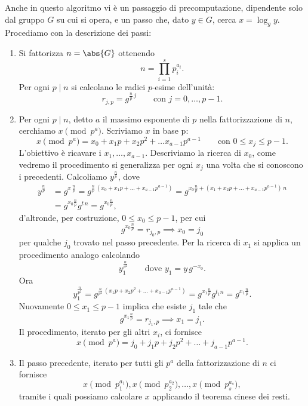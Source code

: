 	Anche in questo algoritmo vi è un passaggio di precomputazione, dipendente solo dal gruppo \(G\) su cui si opera, e un passo che, dato \(y\in G\), cerca \(x=\log_g y\). Procediamo con la descrizione dei passi:

	\begin{enumerate}
		\item Si fattorizza \(n=\abs{G}\) ottenendo
			\[
			n = \prod_{i=1}^s p_i^{a_i}.
			\]
		Per ogni \(p\mid n\) si calcolano le radici \(p\)-esime dell'unità:
			\[
			r_{j,p} = g^{\frac{n}{p}\,j} \qquad\text{con }j=0,\ldots,p-1.
			\]
		\item Per ogni \(p\mid n\), detto \(a\) il massimo esponente di \(p\) nella fattorizzazione di \(n\), cerchiamo \(x \pmod{p^{a}}\). Scriviamo \(x\) in base p:
			\[
			x \pmod{p^a} = x_0  + x_1 p + x_2 p^2 + \ldots x_{a-1}p^{a-1} \qquad\text{con } 0 \le x_j  \le p-1.
			\]
		L'obiettivo è ricavare i \(x_1 ,\ldots,x_{a-1}\). Descriviamo la ricerca di \(x_0 \), come vedremo il procedimento si generalizza per ogni \(x_j \) una volta che si conoscono i precedenti. Calcoliamo \(y^{\frac{n}{p}}\), dove
			\[
			\begin{split}
			y^{\frac{n}{p}} & = g^{x\,\frac{n}{p}} = g^{\frac{n}{p}\,(x_0 +x_1 p+\ldots+x_{a-1}p^{a-1})} = g^{x_0 \frac{n}{p}+(x_1 +x_2 p+\ldots+x_{a-1}p^{a-1})\,n}\\
			& = g^{x_0 \frac{n}{p}}g^{t\,n} = g^{x_0 \frac{n}{p}},
			\end{split}
			\]
		d'altronde, per costruzione, \(0 \le x_0  \le p-1\), per cui
			\[
			g^{x_0 \frac{n}{p}} = r_{j_0,p} \implies x_0 = j_0 
			\]
		per qualche \(j_0\) trovato nel passo precedente.
		Per la ricerca di \(x_1\) si applica un procedimento analogo calcolando
			\[
			y_1^{\frac{n}{p^2}} \qquad\text{dove } y_1 = y\,g^{-x_0}.
			\]
		Ora
			\[
			y_1^{\frac{n}{p^2}} = g^{\frac{n}{p^2}\,(x_1 p + x_2 p^2 +\ldots+ x_{a-1} p^{a-1})} = g^{x_1 \frac{n}{p}}g^{t_1 n} = g^{x_1 \frac{n}{p}}.
			\]
		Nuovamente \(0\le x_1 \le p-1\) implica che esiste \(j_1\) tale che
			\[
			g^{x_1 \frac{n}{p}} = r_{j_1,p} \implies x_1 = j_1.
			\]
		Il procedimento, iterato per gli altri \(x_i\), ci fornisce
			\[
			x \pmod{p^a} = j_0 + j_1 p + j_2 p^2 + \ldots + j_{a-1} p^{a-1}.
			\]
		\item Il passo precedente, iterato per tutti gli \(p^a\) della fattorizzazione di \(n\) ci fornisce
			\[
			x \pmod{p_1^{a_1}}, x \pmod{p_2^{a_2}}, \ldots, x \pmod{p_s^{a_s}},
			\]
		tramite i quali possiamo calcolare \(x\) applicando il teorema cinese dei resti.
	\end{enumerate}

